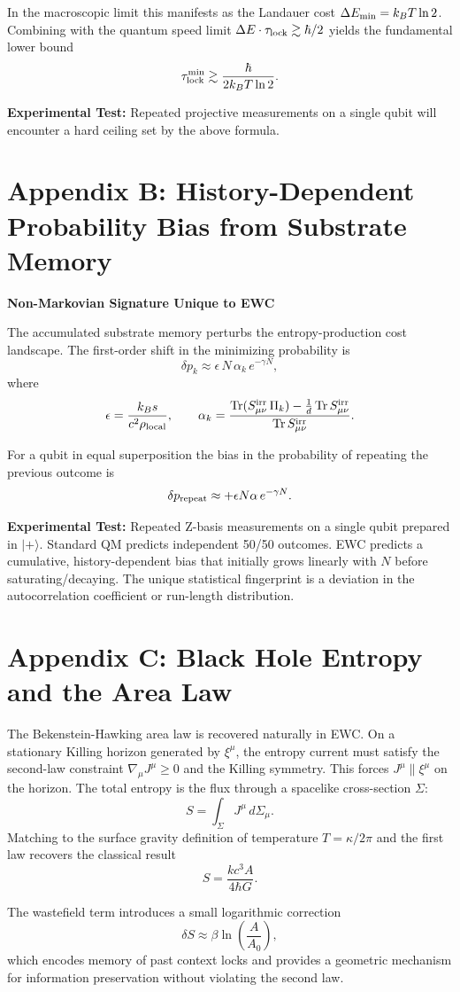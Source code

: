\documentclass[11pt,letterpaper]{article}
\begin{document}
In the macroscopic limit this manifests as the Landauer cost \(\Delta E_{\rm min} = k_B T \ln 2\). Combining with the quantum speed limit \(\Delta E \cdot \tau_{\rm lock} \gtrsim \hbar/2\) yields the fundamental lower bound
\[
\tau_{\rm lock}^{\rm min} \gtrsim \frac{\hbar}{2 k_B T \ln 2}.
\]

\textbf{Experimental Test:} Repeated projective measurements on a single qubit will encounter a hard ceiling set by the above formula.

\section{Appendix B: History-Dependent Probability Bias from Substrate Memory}
\textbf{Non-Markovian Signature Unique to EWC}

The accumulated substrate memory perturbs the entropy-production cost landscape. The first-order shift in the minimizing probability is
\[
\delta p_k \approx \epsilon \, N \, \alpha_k \, e^{-\gamma N},
\]
where
\[
\epsilon = \frac{k_B s}{c^2 \rho_{\rm local}}, \qquad
\alpha_k = \frac{\operatorname{Tr}(S_{\mu\nu}^{\rm irr} \, \Pi_k) - \frac{1}{d} \operatorname{Tr} S_{\mu\nu}^{\rm irr}}{\operatorname{Tr} S_{\mu\nu}^{\rm irr}}.
\]

For a qubit in equal superposition the bias in the probability of repeating the previous outcome is
\[
\delta p_{\rm repeat} \approx +\epsilon N \alpha \, e^{-\gamma N}.
\]

\textbf{Experimental Test:} Repeated Z-basis measurements on a single qubit prepared in \(|+\rangle\). Standard QM predicts independent 50/50 outcomes. EWC predicts a cumulative, history-dependent bias that initially grows linearly with \(N\) before saturating/decaying. The unique statistical fingerprint is a deviation in the autocorrelation coefficient or run-length distribution.

\section{Appendix C: Black Hole Entropy and the Area Law}
The Bekenstein-Hawking area law is recovered naturally in EWC. On a stationary Killing horizon generated by \(\xi^\mu\), the entropy current must satisfy the second-law constraint \(\nabla_\mu J^\mu \geq 0\) and the Killing symmetry. This forces \(J^\mu \parallel \xi^\mu\) on the horizon. The total entropy is the flux through a spacelike cross-section \(\Sigma\):
\[
S = \int_{\Sigma} J^\mu \, d\Sigma_\mu.
\]
Matching to the surface gravity definition of temperature \(T = \kappa / 2\pi\) and the first law recovers the classical result
\[
S = \frac{k c^3 A}{4 \hbar G}.
\]

The wastefield term introduces a small logarithmic correction
\[
\delta S \approx \beta \ln \left( \frac{A}{A_0} \right),
\]
which encodes memory of past context locks and provides a geometric mechanism for information preservation without violating the second law.
\end{document}
